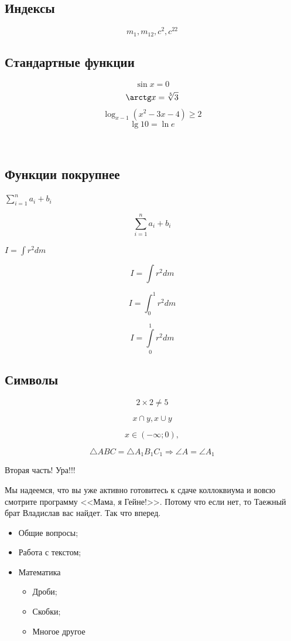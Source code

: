 \documentclass[a4paper,12pt]{article} %
\begin{document}
\subsection{Индексы}

\[ m_1, m_{12}, c^2, c^{22} \]

\subsection{Стандартные функции}

\[ \sin x=0 \]
\[ \arctg x=\sqrt[5]{3} \]
\[ \log_{x-1}{(x^2-3x-4)}\geqslant 2 \]
\[ \lg 10=\ln e \]

$  $\subsection{Функции покрупнее}

$\sum_{i=1}^{n}a_i+b_i$

\[ \sum_{i=1}^{n}a_i+b_i \]

$I=\int r^2dm$

\[I=\int r^2dm \]

\[I=\int_{0}^{1} r^2dm \]

\[I=\int\limits_{0}^{1} r^2dm \]

\subsection{Символы}

\[2\times 2\neq 5 \]

\[x \cap y,  x \cup y\]

\[x\in (-\infty; 0),\]

\[ \triangle ABC = \triangle A_1B_1C_1 \Rightarrow \angle A= \angle A_1\]

\smiley


\newpage

\begin{center}
Вторая часть! Ура!!!
\end{center}

\begin{flushright}
Мы надеемся, что вы уже активно готовитесь к сдаче коллоквиума и вовсю смотрите программу <<Мама, я Гейне!>>. Потому что если нет, то Таежный брат Владислав вас найдет. Так что вперед.
\end{flushright}

\begin{itemize}
\item Общие вопросы;
\item Работа с текстом;
\item Математика
\begin{itemize}
\item Дроби;
\item Скобки;
\item Многое другое
\end{itemize}
\end{itemize}
\end{document}
